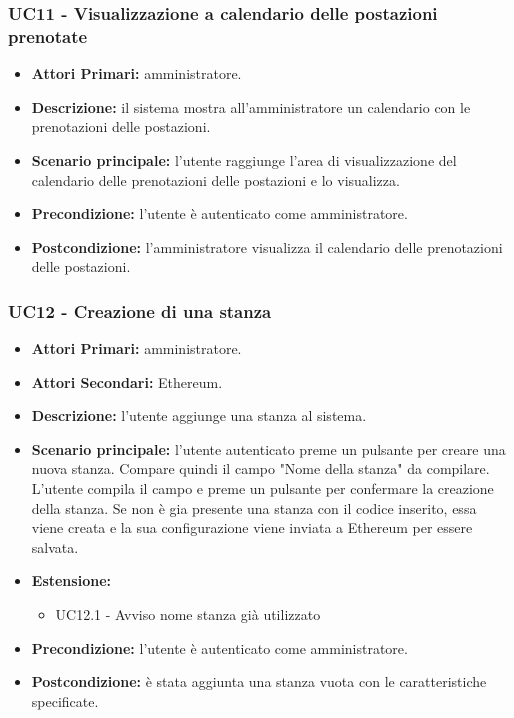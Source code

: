 \subsubsection{ UC11 - Visualizzazione a calendario delle postazioni prenotate}
\begin{itemize}
	\item\textbf{Attori Primari:}
	amministratore.
	\item\textbf{Descrizione:}
	il sistema mostra all'amministratore un calendario con le prenotazioni delle postazioni.
	\item\textbf{Scenario principale:}
	l'utente raggiunge l'area di visualizzazione del calendario delle prenotazioni delle postazioni e lo visualizza.
	\item\textbf{Precondizione:} 
	l'utente è autenticato come amministratore.
	\item\textbf{Postcondizione:}
	l'amministratore visualizza il calendario delle prenotazioni delle postazioni.
\end{itemize}

\subsubsection{ UC12 - Creazione di una stanza}
\begin{itemize}
	\item\textbf{Attori Primari:}
	amministratore.
	\item\textbf{Attori Secondari:}
	Ethereum.
	\item\textbf{Descrizione:} 
	l'utente aggiunge una stanza al sistema.
	\item\textbf{Scenario principale:} 
	l'utente autenticato preme un pulsante per creare una nuova stanza. Compare quindi il campo "Nome della stanza" da compilare.
	L'utente compila il campo e preme un pulsante per confermare la creazione della stanza.
	Se non è gia presente una stanza con il codice inserito, essa viene creata e la sua configurazione viene inviata a Ethereum per essere salvata.
	\item\textbf{Estensione:}
	\begin{itemize}
		\item UC12.1 - Avviso nome stanza già utilizzato
	\end{itemize}
	
	\item\textbf{Precondizione:} 
	l'utente è autenticato come amministratore.
	\item\textbf{Postcondizione:}
	è stata aggiunta una stanza vuota con le caratteristiche specificate.
\end{itemize}

